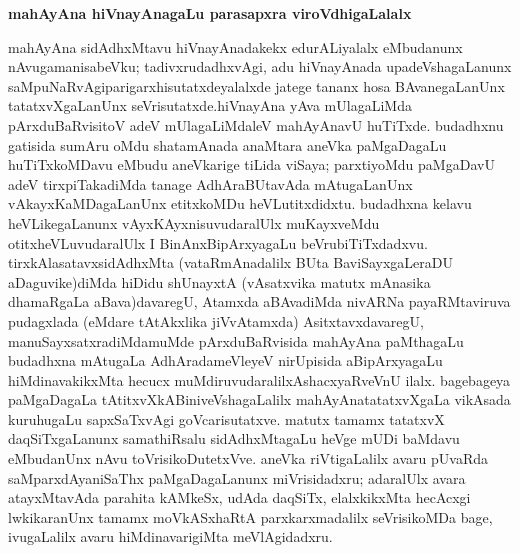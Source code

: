 \begin{center}
{\textbf{\Large mahAyAna hiVnayAnagaLu parasapxra viroVdhigaLalalx}}
\end{center}

mahAyAna sidAdhxMtavu hiVnayAnadakekx edurALiyalalx eMbudanunx nAvu\break gamanisabeVku; tadivxrudadhxvAgi, adu hiVnayAnada upadeVshagaLanunx saMpuNaRvAgi\break parigarxhisutatxdeyalalxde jatege tananx hosa BAvanegaLanUnx tatatxvXgaLanUnx seVrisutatxde.\break hiVnayAna yAva mUlagaLiMda pArxduBaRvisitoV adeV mUlagaLiMdaleV mahA\-yAnavU huTiTxde. budadhxnu gatisida sumAru oMdu shatamAnada anaMtara aneVka paMga\-DagaLu huTiTxkoMDavu eMbudu aneVkarige tiLida viSaya; parxtiyoMdu paMga\-DavU adeV tirxpiTakadiMda tanage AdhAraBUtavAda mAtugaLanUnx vAkayxKaMDa\-gaLanUnx  etitxkoMDu heVLutitxdidxtu. budadhxna kelavu heVLikegaLanunx vAyxKAyxnisuvudaralUlx muKayx\-veMdu otitxheVLuvudaralUlx I BinAnxBipArxyagaLu beVrubiTiTxdadxvu. tirxkAlasatavxsidAdhxMta (vataRmAnadalilx BUta BaviSayxgaLeraDU aDaguvike)diMda hiDidu shUnayxtA (vAsatxvika matutx mAnasika dhamaRgaLa aBava)davaregU, Atamxda aBAvadiMda nivARNa payaRMta\-viruva pudagxlada (eMdare tAtAkxlika jiVvAtamxda) AsitxtavxdavaregU, manuSayxsatxradiMda\break muMde pArxduBaRvisida mahAyAna paMthagaLu budadhxna mAtugaLa AdhArada\break meVleyeV nirUpisida aBipArxyagaLu hiMdinavakikxMta hecucx muMdiruvudaralilx\break AshacxyaR\-veVnU ilalx. bagebageya paMgaDagaLa tAtitxvXkABiniveVshagaLalilx mahAyAnatatatxvXgaLa vikAsada kuruhugaLu sapxSaTxvAgi goVcarisutatxve. matutx tamamx tatatxvX daqSiTx\-gaLanunx samathiRsalu sidAdhxMtagaLu heVge mUDi baMdavu eMbudanUnx nAvu toVrisi\-koDu\-tetxVve. aneVka riVtigaLalilx avaru pUvaRda saMparxdAyaniSaThx paMgaDagaLanunx miVrisidadxru; adaralUlx avara atayxMtavAda parahita kAMkeSx, udAda daqSiTx, elalxkikxMta hecAcxgi lwkikaranUnx tamamx moVkASxhaRtA parxkarxmadalilx seVrisikoMDa bage, ivugaLalilx avaru hiMdinava\-rigiMta meVlAgidadxru.

